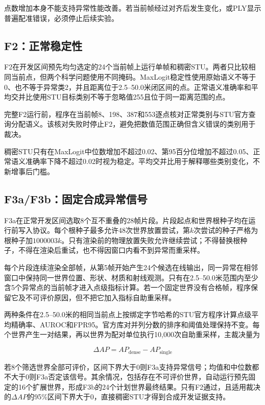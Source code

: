 \documentclass[UTF8,a4paper,zihao=5,fontset=none]{ctexart}
\begin{document}
点数增加本身不能支持异常性能改善。若当前帧经过对齐后发生变化，或PLY显示普遍配准错误，必须停止后续实验。

\subsection{F2：正常稳定性}

F2在开发区间预先均匀选定的24个当前帧上运行单帧和稠密STU。两者只比较相同当前点，但两个科学问题使用不同掩码。MaxLogit稳定性使用原始语义不等于0、也不等于异常类2，并且距离位于2.5--50.0米闭区间的点。正常语义准确率和平均交并比使用STU目标类别不等于忽略值255且位于同一距离范围的点。

完整F2运行前，程序在当前帧8、198、387和553逐点核对正常类别与STU官方查询分配语义。该核对失败时停止F2，避免把数值范围正确但含义错误的类别用于裁决。

稠密STU只有在MaxLogit中位数增加不超过0.02、第95百分位增加不超过0.05、正常语义准确率下降不超过0.02时视为稳定。平均交并比用于解释哪些类别变化，不新增事后门槛。

\subsection{F3a/F3b：固定合成异常信号}

F3a在正常开发区间选取8个互不重叠的28帧片段。片段起点和世界根种子均在运行前写入协议。每个根种子最多允许48次世界放置尝试，第$k$次尝试的种子严格为根种子加$1000003k$。只有渲染前的物理放置失败允许继续尝试；不得替换根种子，不得在渲染后重试，也不得因窗口内看不到异常而重采样。

每个片段连续渲染全部帧，从第5帧开始产生24个候选在线输出，同一异常在相邻窗口中保持同一世界位置、形状、材质和射线观测。只有在2.5--50.0米范围内至少含5个异常点的当前帧才进入点级指标计算。若一个固定世界没有合格帧，程序保留它及不可评价原因，但不把它加入指标自助重采样。

两种条件在2.5--50.0米的相同当前点上按绑定字节哈希的STU官方程序计算点级平均精确率、AUROC和FPR95。官方库对并列分数的排序和阈值处理保持不变。每个世界产生一对结果，再以世界为配对单位执行10,000次自助重采样，主裁决量为

\begin{equation}
\Delta AP=AP_{\mathrm{dense}}-AP_{\mathrm{single}}
\end{equation}

若8个筛选世界全部可评价，区间下界大于0则F3a支持异常信号；均值和中位数都不大于0则F3a否定该信号。其余情况，包括存在不可评价世界，自动运行预先固定的16个扩展世界，形成F3b的24个计划世界最终结果。只有F2通过，且适用裁决的$\Delta AP$的95\%区间下界大于0，直接稠密STU才得到合成开发证据支持。
\end{document}
